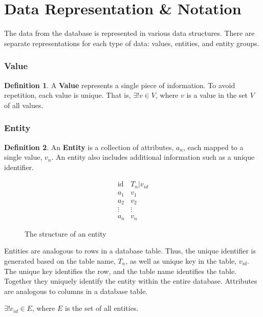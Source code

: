 \documentclass[12pt,letterpaper,oneside,notitlepage]{report}
\theoremstyle{definition}
\newtheorem{defn}{Definition}
\begin{document}
		\section{Data Representation \& Notation}
		\label{sec:data-representation-notation}
			The data from the database is represented in various data structures.  There are separate representations for each type of data:  values, entities, and entity groups.

				\subsubsection{Value}
					\begin{defn}
						A \textbf{Value} represents a single piece of information.  To avoid repetition, each value is unique.  That is, $\exists! v \in V$, where $v$ is a value in the set $V$ of all values.
					\end{defn}

				\subsubsection{Entity}
					\begin{defn}
						An \textbf{Entity} is a collection of attributes, $a_n$, each mapped to a single value, $v_n$.  An entity also includes additional information such as a unique identifier.

						\begin{figure}[!ht]
							\centering
							\[
								\begin{array}{ll}
									\mathrm{id} & T_n|v_{id} \\
									a_1 & v_1 \\
									a_2 & v_2 \\
									\vdots & \vdots \\
									a_n & v_n
								\end{array}
							\]
							\caption{The structure of an entity}
							\label{fig:entity-rep}
						\end{figure}

						Entities are analogous to rows in a database table.  Thus, the unique identifier is generated based on the table name, $T_n$, as well as unique key in the table, $v_{id}$.  The unique key identifies the row, and the table name identifies the table.  Together they uniquely identify the entity within the entire database.  Attributes are analogous to columns in a database table.

						$\exists! e_{id} \in E$, where $E$ is the set of all entities.
					\end{defn}
\end{document}
